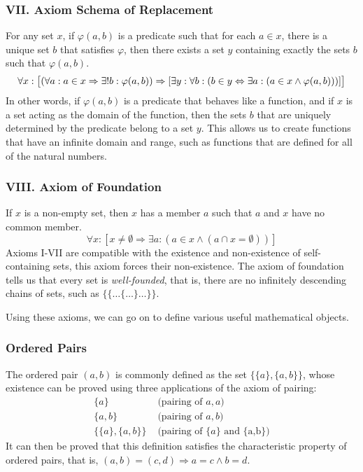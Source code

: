 \documentclass[11pt]{report}
\theoremstyle{definition}
\theoremstyle{theorem}
\theoremstyle{lemma}
\begin{document}
\subsubsection*{VII. Axiom Schema of Replacement}
For any set $x$, if $\varphi(a,b)$ is a predicate such that for each $a\in x$, there is a unique set $b$ that satisfies $\varphi$, then there exists a set $y$ containing exactly the sets $b$ such that $\varphi(a,b)$.
$$\forall x: \big{[}(\forall a: a\in x \Rightarrow \exists! b: \varphi(a,b))
  \Rightarrow [\exists y: \forall b: (b \in y \Leftrightarrow \exists a: (a\in x \wedge \varphi(a,b)))]\big{]}$$
In other words, if $\varphi(a,b)$ is a predicate that behaves like a function, and if $x$ is a set acting as the domain of the function, then the sets $b$ that are uniquely determined by the predicate belong to a set $y$. This allows us to create functions that have an infinite domain and range, such as functions that are defined for all of the natural numbers.

\subsubsection*{VIII. Axiom of Foundation}
If $x$ is a non-empty set, then $x$ has a member $a$ such that $a$ and $x$ have no common member.
$$\forall x: [x \neq \emptyset \Rightarrow \exists a: (a\in x \wedge (a \cap x = \emptyset))]$$
Axioms I-VII are compatible with the existence and non-existence of self-containing sets, this axiom forces their non-existence. The axiom of foundation tells us that every set is \emph{well-founded}, that is, there are no infinitely descending chains of sets, such as $\{\{\ldots\{\ldots\}\ldots\}\}$.

Using these axioms, we can go on to define various useful mathematical objects.

\subsubsection*{Ordered Pairs}
The ordered pair $(a,b)$ is commonly defined as the set $\{\{a\},\{a,b\}\}$, whose existence can be proved using three applications of the axiom of pairing:
\begin{align*}
  \{a\} & \text{  (pairing of $a,a$)} \\
  \{a,b\} & \text{  (pairing of $a,b$)} \\
  \{\{a\}, \{a,b\}\} & \text{  (pairing of $\{a\}$ and \{a,b\})}
\end{align*}
It can then be proved that this definition satisfies the characteristic property of ordered pairs, that is, $(a,b) = (c,d) \Rightarrow a=c \wedge b=d$.
\end{document}
